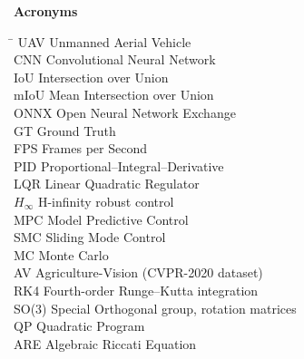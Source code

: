 \documentclass[12pt,a4paper]{article}
\begin{document}
\noindent\textbf{Acronyms}
\begin{tabbing}
\hspace{3.2cm}\=\hspace{10cm}\kill
UAV     \> Unmanned Aerial Vehicle \\
CNN     \> Convolutional Neural Network \\
IoU     \> Intersection over Union \\
mIoU    \> Mean Intersection over Union \\
ONNX    \> Open Neural Network Exchange \\
GT      \> Ground Truth \\
FPS     \> Frames per Second \\
PID     \> Proportional--Integral--Derivative \\
LQR     \> Linear Quadratic Regulator \\
$H_\infty$ \> H-infinity robust control \\
MPC     \> Model Predictive Control \\
SMC     \> Sliding Mode Control \\
MC      \> Monte Carlo \\
AV      \> Agriculture-Vision (CVPR-2020 dataset) \\
RK4     \> Fourth-order Runge--Kutta integration \\
SO(3)   \> Special Orthogonal group, rotation matrices \\
QP      \> Quadratic Program \\
ARE     \> Algebraic Riccati Equation \\
\end{tabbing}

\clearpage
\end{document}
